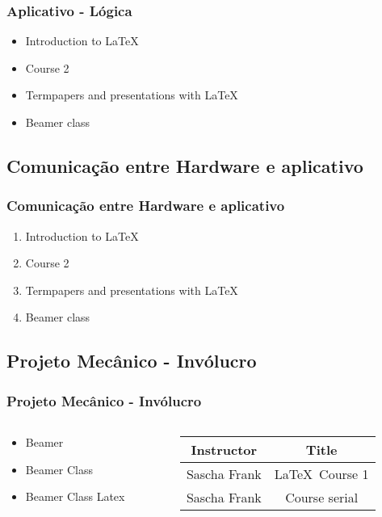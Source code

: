 \documentclass{beamer}
\begin{document}
        \begin{frame}\frametitle{Aplicativo - Lógica}
        \begin{itemize}
        \item Introduction to  \LaTeX \pause
        \item Course 2 \pause
        \item Termpapers and presentations with \LaTeX \pause
        \item Beamer class
        \end{itemize}
        \end{frame}

        \subsection{Comunicação entre Hardware e aplicativo}

        \begin{frame}\frametitle{Comunicação entre Hardware e aplicativo}
        \begin{enumerate}
        \item Introduction to  \LaTeX
        \item Course 2
        \item Termpapers and presentations with \LaTeX
        \item Beamer class
        \end{enumerate}
        \end{frame}

        \subsection{Projeto Mecânico - Invólucro}

        \begin{frame}\frametitle{Projeto Mecânico - Invólucro}
        \begin{columns}
        \begin{column}{5cm}
        \begin{itemize}
        \item Beamer
        \item Beamer Class
        \item Beamer Class Latex
        \end{itemize}
        \end{column}
        \begin{column}{5cm}
        \begin{tabular}{|c|c|}
        \hline
        \textbf{Instructor} & \textbf{Title} \\
        \hline
        Sascha Frank &  \LaTeX \ Course 1 \\
        \hline
        Sascha Frank &  Course serial  \\
        \hline
        \end{tabular}
        \end{column}
        \end{columns}
        \end{frame}
\end{document}
